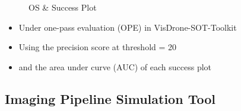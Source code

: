 \documentclass{beamer}
\begin{document}
\begin{frame}
    \begin{figure}[htpb]
        \centering
        \hspace{0pt}
        \caption{OS \& Success Plot}
    \end{figure}
\end{frame}

\begin{frame}
    \begin{itemize}[<+-| alert@+>]
        \item Under one-pass evaluation (OPE) in VisDrone-SOT-Toolkit
        \item Using the precision score at threshold = 20
        \item and the area under curve (AUC) of each success plot
    \end{itemize}
\end{frame}

\subsection{Imaging Pipeline Simulation Tool}
\end{document}
